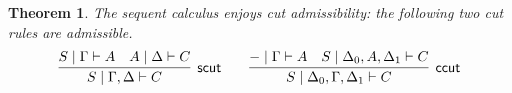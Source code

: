 \documentclass[copyright,creativecommons]{eptcs}
\newtheorem{theorem}{Theorem}[section]
\theoremstyle{definition}
\newcommand{\tl}{\otimes \mathsf{L}}
\newcommand{\tr}{\otimes \mathsf{R}}
\newcommand{\lright}{{\multimap}\mathsf{R}}
\newcommand{\lleft}{{\multimap}\mathsf{L}}
\newcommand{\ot}{\otimes}
\newcommand{\lolli}{\multimap}
\newcommand{\defeq}{=_{\mathsf{df}}}
\begin{document}
\begin{theorem}
The sequent calculus enjoys cut admissibility: the following two cut rules are admissible.
  \begin{displaymath}
    \infer[\mathsf{scut}]{S \mid \Gamma , \Delta \vdash C}{
      S \mid \Gamma \vdash A
      &
      A \mid \Delta \vdash C
    }
    \qquad
    \infer[\mathsf{ccut}]{S \mid \Delta_0 , \Gamma , \Delta_1 \vdash C}{
      {-} \mid \Gamma \vdash A
      &
      S \mid \Delta_0 , A , \Delta_1 \vdash C
    }
  \end{displaymath}
\end{theorem}
%
\end{document}
